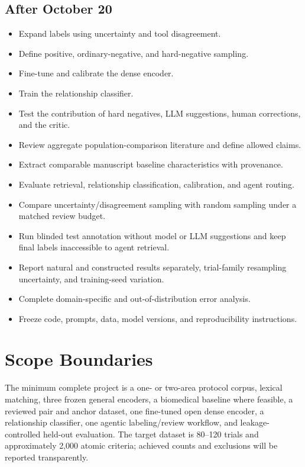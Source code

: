 \documentclass[11pt]{article}
\begin{document}
\subsection*{After October 20}
\begin{itemize}[label=$\square$]
    \item Expand labels using uncertainty and tool disagreement.
    \item Define positive, ordinary-negative, and hard-negative sampling.
    \item Fine-tune and calibrate the dense encoder.
    \item Train the relationship classifier.
    \item Test the contribution of hard negatives, LLM suggestions, human corrections, and the critic.
    \item Review aggregate population-comparison literature and define allowed claims.
    \item Extract comparable manuscript baseline characteristics with provenance.
    \item Evaluate retrieval, relationship classification, calibration, and agent routing.
    \item Compare uncertainty/disagreement sampling with random sampling under a matched review budget.
    \item Run blinded test annotation without model or LLM suggestions and keep final labels inaccessible to agent retrieval.
    \item Report natural and constructed results separately, trial-family resampling uncertainty, and training-seed variation.
    \item Complete domain-specific and out-of-distribution error analysis.
    \item Freeze code, prompts, data, model versions, and reproducibility instructions.
\end{itemize}

\section{Scope Boundaries}

The minimum complete project is a one- or two-area protocol corpus, lexical matching, three frozen general encoders, a biomedical baseline where feasible, a reviewed pair and anchor dataset, one fine-tuned open dense encoder, a relationship classifier, one agentic labeling/review workflow, and leakage-controlled held-out evaluation. The target dataset is 80--120 trials and approximately 2,000 atomic criteria; achieved counts and exclusions will be reported transparently.
\end{document}
